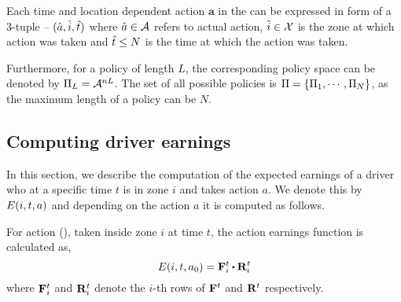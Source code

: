 Each time and location dependent action $\mathbf{a}$ in the {\policy} can be expressed in form of a 3-tuple -- $(\hat{a}, \hat{i}, \hat{t})$
where $\hat{a} \in \mathcal{A}$ refers to actual action, $\hat{i} \in \mathcal{X}$ is the zone at which action was taken and $\hat{t} \leq N$ is the 
time at which the action was taken.



Furthermore, for a policy of length $L$, the corresponding policy space can be denoted by
$\Pi_L = \mathcal{A}^{nL}$. The set of all possible policies is $\Pi = \{\Pi_1, \cdots, \Pi_N\}$, as the maximum length of a policy can be $N$.


\subsection{Computing driver earnings}
In this section, we describe the computation of the expected earnings of a driver
who at a specific time $t$ is in zone $i$ and takes action $a$. We denote this by 
$E({i},{t},{a})$ and depending on the action $a$ it is computed as follows.

\squishlist
	\item For action {\getpassengeraction} ({\getpassenger}), taken inside zone $i$ at time $t$, the action earnings function
	is calculated as,
	\begin{equation}\label{eq:a0}
	\actionearning{i}{t}{a_0} = \empiricaltransitionmatrix^t_{i}\bigcdot \rewardsmatrix^t_{i}
	\end{equation}
	where ${\mathbf{F}}^t_{i}$ and ${\mathbf{R}}^t_{i}$ denote the $i$-th rows of ${\mathbf{F}}^t$ and ${\mathbf{R}}^t$ respectively. 
	
